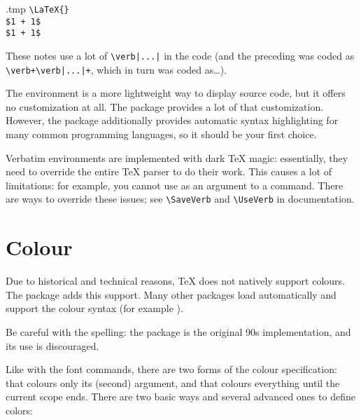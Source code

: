 \begin{VerbatimOut}{\jobname.tmp}
\verb+\LaTeX{}+ \\
\verb|$1 + 1$| \\
\verb*|$1 + 1$|
\end{VerbatimOut}
\ShowExample
%
These notes use a lot of \verb+\verb|...|+ in the code
(and the preceding was coded as
\verb!\verb+\verb|...|+!, which in turn was coded as\dots).

The  environment is a more lightweight way to display source code,
but it offers no customization at all.
The  package provides a lot of that customization.
However, the  package additionally provides automatic syntax highlighting
for many common programming languages, so it should be your first choice.

\begin{technote}
Verbatim environments are implemented with dark \TeX{} magic:
essentially, they need to override the entire \TeX{} parser to do their work.
This causes a lot of limitations:
for example, you cannot use  as an argument to a command.
There are ways to override these issues;
see \verb|\SaveVerb| and \verb|\UseVerb| in  documentation.
\end{technote}


%
%
%
\section{Colour}\label{sec:colour}

Due to historical and technical reasons, \TeX{} does not natively support colours.
The  package adds this support.
Many other packages load  automatically
and support the colour syntax (for example ).

\begin{gotcha}
Be careful with the spelling: the  package is the original 90s implementation,
and its use is discouraged.
\end{gotcha}

Like with the font commands, there are two forms of the colour specification:
 that colours only its (second) argument,
and  that colours everything until the current scope ends.
There are two basic ways and several advanced ones to define colors:

